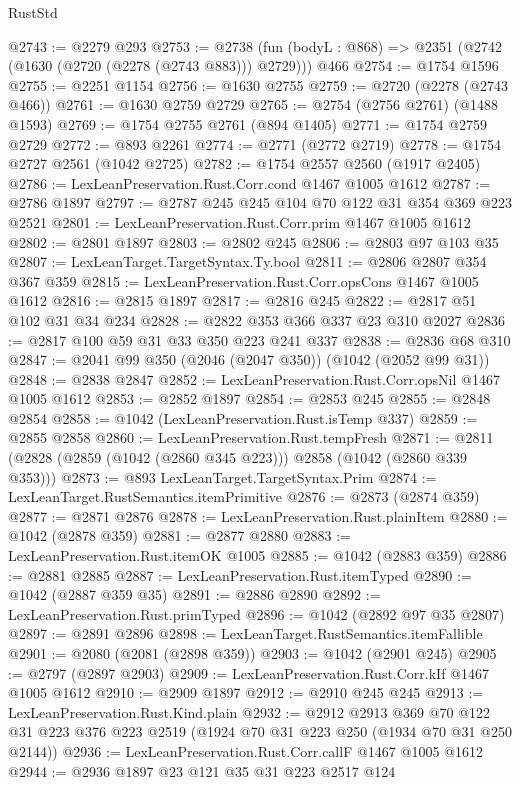 \begin{lexlean}{RustStd}
\begin{coremodule}
@2743 := @2279 @293
@2753 := @2738 (fun (bodyL : @868) => @2351 (@2742 (@1630 (@2720 (@2278 (@2743 @883))) @2729))) @466
@2754 := @1754 @1596
@2755 := @2251 @1154
@2756 := @1630 @2755
@2759 := @2720 (@2278 (@2743 @466))
@2761 := @1630 @2759 @2729
@2765 := @2754 (@2756 @2761) (@1488 @1593)
@2769 := @1754 @2755 @2761 (@894 @1405)
@2771 := @1754 @2759 @2729
@2772 := @893 @2261
@2774 := @2771 (@2772 @2719)
@2778 := @1754 @2727 @2561 (@1042 @2725)
@2782 := @1754 @2557 @2560 (@1917 @2405)
@2786 := LexLeanPreservation.Rust.Corr.cond @1467 @1005 @1612
@2787 := @2786 @1897
@2797 := @2787 @245 @245 @104 @70 @122 @31 @354 @369 @223 @2521
@2801 := LexLeanPreservation.Rust.Corr.prim @1467 @1005 @1612
@2802 := @2801 @1897
@2803 := @2802 @245
@2806 := @2803 @97 @103 @35
@2807 := LexLeanTarget.TargetSyntax.Ty.bool
@2811 := @2806 @2807 @354 @367 @359
@2815 := LexLeanPreservation.Rust.Corr.opsCons @1467 @1005 @1612
@2816 := @2815 @1897
@2817 := @2816 @245
@2822 := @2817 @51 @102 @31 @34 @234
@2828 := @2822 @353 @366 @337 @23 @310 @2027
@2836 := @2817 @100 @59 @31 @33 @350 @223 @241 @337
@2838 := @2836 @68 @310
@2847 := @2041 @99 @350 (@2046 (@2047 @350)) (@1042 (@2052 @99 @31))
@2848 := @2838 @2847
@2852 := LexLeanPreservation.Rust.Corr.opsNil @1467 @1005 @1612
@2853 := @2852 @1897
@2854 := @2853 @245
@2855 := @2848 @2854
@2858 := @1042 (LexLeanPreservation.Rust.isTemp @337)
@2859 := @2855 @2858
@2860 := LexLeanPreservation.Rust.tempFresh
@2871 := @2811 (@2828 (@2859 (@1042 (@2860 @345 @223))) @2858 (@1042 (@2860 @339 @353)))
@2873 := @893 LexLeanTarget.TargetSyntax.Prim
@2874 := LexLeanTarget.RustSemantics.itemPrimitive
@2876 := @2873 (@2874 @359)
@2877 := @2871 @2876
@2878 := LexLeanPreservation.Rust.plainItem
@2880 := @1042 (@2878 @359)
@2881 := @2877 @2880
@2883 := LexLeanPreservation.Rust.itemOK @1005
@2885 := @1042 (@2883 @359)
@2886 := @2881 @2885
@2887 := LexLeanPreservation.Rust.itemTyped
@2890 := @1042 (@2887 @359 @35)
@2891 := @2886 @2890
@2892 := LexLeanPreservation.Rust.primTyped
@2896 := @1042 (@2892 @97 @35 @2807)
@2897 := @2891 @2896
@2898 := LexLeanTarget.RustSemantics.itemFallible
@2901 := @2080 (@2081 (@2898 @359))
@2903 := @1042 (@2901 @245)
@2905 := @2797 (@2897 @2903)
@2909 := LexLeanPreservation.Rust.Corr.kIf @1467 @1005 @1612
@2910 := @2909 @1897
@2912 := @2910 @245 @245
@2913 := LexLeanPreservation.Rust.Kind.plain
@2932 := @2912
    @2913
    @369
    @70
    @122
    @31
    @223
    @376
    @223
    @2519
    (@1924 @70 @31 @223 @250 (@1934 @70 @31 @250 @2144))
@2936 := LexLeanPreservation.Rust.Corr.callF @1467 @1005 @1612
@2944 := @2936 @1897 @23 @121 @35 @31 @223 @2517 @124

\end{coremodule}
\end{lexlean}
